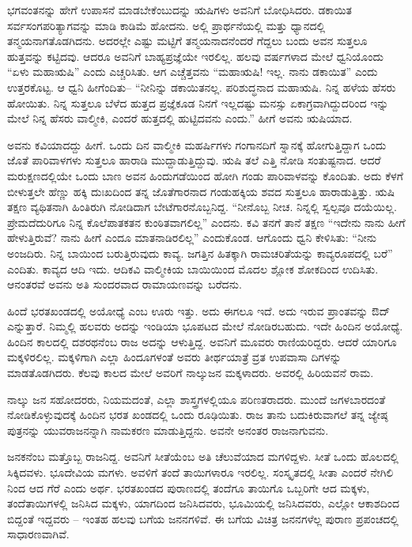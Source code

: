 ಭಗವಂತನನ್ನು ಹೇಗೆ ಉಪಾಸನೆ ಮಾಡಬೇಕೆಂಬುದನ್ನು ಋಷಿಗಳು ಅವನಿಗೆ ಬೋಧಿಸಿದರು. ಡಕಾಯಿತ ಸರ್ವಸಂಗಪರಿತ್ಯಾಗವನ್ನು ಮಾಡಿ ಕಾಡಿಮೆ ಹೋದನು. ಅಲ್ಲಿ ಪ್ರಾರ್ಥನೆಯಲ್ಲಿ ಮತ್ತು ಧ್ಯಾನದಲ್ಲಿ ತನ್ಮಯನಾಗತೊಡಗಿದನು. ಅದರಲ್ಲೇ ಎಷ್ಟು ಮಟ್ಟಿಗೆ ತನ್ಮಯನಾದನೆಂದರೆ ಗೆದ್ದಲು ಬಂದು ಅವನ ಸುತ್ತಲೂ ಹುತ್ತವನ್ನು ಕಟ್ಟಿದವು. ಆದರೂ ಅವನಿಗೆ ಬಾಹ್ಯಪ್ರಜ್ಞೆಯೇ ಇರಲಿಲ್ಲ. ಹಲವು ವರ್ಷಗಳಾದ ಮೇಲೆ ಧ್ವನಿಯೊಂದು “ಏಳು ಮಹಾಋಷಿ” ಎಂದು ಎಚ್ಚರಿಸಿತು. ಆಗ ಎಚ್ಚೆತ್ತವನು “ಮಹಾಋಷಿ! ಇಲ್ಲ. ನಾನು ಡಕಾಯಿತ” ಎಂದು ಉತ್ತರಕೊಟ್ಟ. ಆ ಧ್ವನಿ ಹೀಗೆಂದಿತು– “ನೀನಿನ್ನು ಡಕಾಯಿತನಲ್ಲ. ಪರಿಶುದ್ಧನಾದ ಮಹಾಋಷಿ. ನಿನ್ನ ಹಳೆಯ ಹೆಸರು ಹೋಯಿತು. ನಿನ್ನ ಸುತ್ತಲೂ ಬೆಳೆದ ಹುತ್ತದ ಪ್ರಜ್ಞೆಕೂಡ ನಿನಗೆ ಇಲ್ಲದಷ್ಟು ಮನಸ್ಸು ಏಕಾಗ್ರವಾಗಿದ್ದುದರಿಂದ ಇನ್ನು ಮೇಲೆ ನಿನ್ನ ಹೆಸರು ವಾಲ್ಮೀಕಿ, ಎಂದರೆ ಹುತ್ತದಲ್ಲಿ ಹುಟ್ಟಿದವನು ಎಂದು.” ಹೀಗೆ ಅವನು ಋಷಿಯಾದ.

ಅವನು ಕವಿಯಾದದ್ದು ಹೀಗೆ. ಒಂದು ದಿನ ವಾಲ್ಮೀಕಿ ಮಹರ್ಷಿಗಳು ಗಂಗಾನದಿಗೆ ಸ್ನಾನಕ್ಕೆ ಹೋಗುತ್ತಿದ್ದಾಗ ಒಂದು ಜೊತೆ ಪಾರಿವಾಳಗಳು ಸುತ್ತಲೂ ಹಾರಾಡಿ ಮುದ್ದಾಡುತ್ತಿದ್ದುವು. ಋಷಿ ತಲೆ ಎತ್ತಿ ನೋಡಿ ಸಂತುಷ್ಟನಾದ. ಆದರೆ ಮರುಕ್ಷಣದಲ್ಲಿಯೇ ಒಂದು ಬಾಣ ಅವನ ಹಿಂದುಗಡೆಯಿಂದ ಹೋಗಿ ಗಂಡು ಪಾರಿವಾಳವನ್ನು ಕೊಂದಿತು. ಅದು ಕೆಳಗೆ ಬೀಳುತ್ತಲೇ ಹೆಣ್ಣು ಹಕ್ಕಿ ದುಃಖದಿಂದ ತನ್ನ ಜೊತೆಗಾರನಾದ ಗಂಡುಹಕ್ಕಿಯ ಶವದ ಸುತ್ತಲೂ ಹಾರಾಡುತ್ತಿತ್ತು. ಋಷಿ ತಕ್ಷಣ ವ್ಯಥಿತನಾಗಿ ಹಿಂತಿರುಗಿ ನೋಡಿದಾಗ ಬೇಟೆಗಾರನೊಬ್ಬನಿದ್ದ. “ನೀನೊಬ್ಬ ನೀಚ. ನಿನ್ನಲ್ಲಿ ಸ್ವಲ್ಪವೂ ದಯೆಯಿಲ್ಲ. ಪ್ರೇಮದೆದುರಿಗೂ ನಿನ್ನ ಕೊಲೆಪಾತಕತನ ಕುಂಠಿತವಾಗಲಿಲ್ಲ” ಎಂದನು. ಕವಿ ತನಗೆ ತಾನೆ ತಕ್ಷಣ “ಇದೇನು ನಾನು ಹೀಗೆ ಹೇಳುತ್ತಿರುವೆ? ನಾನು ಹೀಗೆ ಎಂದೂ ಮಾತನಾಡಿರಲಿಲ್ಲ” ಎಂದುಕೊಂಡ. ಆಗೊಂದು ಧ್ವನಿ ಕೇಳಿಸಿತು: “ನೀನು ಅಂಜದಿರು. ನಿನ್ನ ಬಾಯಿಂದ ಬರುತ್ತಿರುವುದು ಕಾವ್ಯ. ಜಗತ್ತಿನ ಹಿತಕ್ಕಾಗಿ ರಾಮಚರಿತೆಯನ್ನು ಕಾವ್ಯರೂಪದಲ್ಲಿ ಬರೆ” ಎಂದಿತು. ಕಾವ್ಯದ ಆದಿ ಇದು. ಆದಿಕವಿ ವಾಲ್ಮೀಕಿಯ ಬಾಯಿಯಿಂದ ಮೊದಲ ಶ್ಲೋಕ ಶೋಕದಿಂದ ಉದಿಸಿತು. ಆನಂತರವೆ ಅವನು ಅತಿ ಸುಂದರವಾದ ರಾಮಾಯಣವನ್ನು ಬರೆದನು.

ಹಿಂದೆ ಭರತಖಂಡದಲ್ಲಿ ಅಯೋಧ್ಯೆ ಎಂಬ ಊರು ಇತ್ತು. ಅದು ಈಗಲೂ ಇದೆ. ಅದು ಇರುವ ಪ್ರಾಂತವನ್ನು ಔದ್​ ಎನ್ನುತ್ತಾರೆ. ನಿಮ್ಮಲ್ಲಿ ಹಲವರು ಅದನ್ನು ಇಂಡಿಯಾ ಭೂಪಟದ ಮೇಲೆ ನೋಡಿರಬಹುದು. ಇದೇ ಹಿಂದಿನ ಅಯೋಧ್ಯೆ. ಹಿಂದಿನ ಕಾಲದಲ್ಲಿ ದಶರಥನೆಂಬ ರಾಜ ಅದನ್ನು ಆಳುತ್ತಿದ್ದ. ಅವನಿಗೆ ಮೂವರು ರಾಣಿಯರಿದ್ದರು. ಆದರೆ ಯಾರಿಗೂ ಮಕ್ಕಳಿರಲಿಲ್ಲ. ಮಕ್ಕಳಿಗಾಗಿ ಎಲ್ಲಾ ಹಿಂದೂಗಳಂತೆ ಅವರು ತೀರ್ಥಯಾತ್ರೆ ವ್ರತ ಉಪವಾಸಾ ದಿಗಳನ್ನು ಮಾಡತೊಡಗಿದರು. ಕೆಲವು ಕಾಲದ ಮೇಲೆ ಅವರಿಗೆ ನಾಲ್ಕುಜನ ಮಕ್ಕಳಾದರು. ಅವರಲ್ಲಿ ಹಿರಿಯವನೆ ರಾಮ.

ನಾಲ್ಕು ಜನ ಸಹೋದರರು, ನಿಯಮದಂತೆ, ಎಲ್ಲಾ ಶಾಸ್ತ್ರಗಳಲ್ಲಿಯೂ ಪರಿಣತರಾದರು. ಮುಂದೆ ಜಗಳಬಾರದಂತೆ ನೋಡಿಕೊಳ್ಳುವುದಕ್ಕೆ ಹಿಂದಿನ ಭರತ ಖಂಡದಲ್ಲಿ ಒಂದು ರೂಢಿಯಿತು. ರಾಜ ತಾನು ಬದುಕಿರುವಾಗಲೆ ತನ್ನ ಜ್ಯೇಷ್ಠ ಪುತ್ರನನ್ನು ಯುವರಾಜನನ್ನಾಗಿ ನಾಮಕರಣ ಮಾಡುತ್ತಿದ್ದನು. ಅವನೇ ಅನಂತರ ರಾಜನಾಗುವನು.

ಜನಕನೆಂಬ ಮತ್ತೊಬ್ಬ ರಾಜನಿದ್ದ. ಅವನಿಗೆ ಸೀತೆಯೆಂಬ ಅತಿ ಚೆಲುವೆಯಾದ ಮಗಳಿದ್ದಳು. ಸೀತೆ ಒಂದು ಹೊಲದಲ್ಲಿ ಸಿಕ್ಕಿದವಳು. ಭೂದೇವಿಯ ಮಗಳು. ಅವಳಿಗೆ ತಂದೆ ತಾಯಿಗಳಾರೂ ಇರಲಿಲ್ಲ. ಸಂಸ್ಕೃತದಲ್ಲಿ ಸೀತಾ ಎಂದರೆ ನೇಗಿಲಿ ನಿಂದ ಆದ ಗೆರೆ ಎಂದು ಅರ್ಥ. ಭರತಖಂಡದ ಪುರಾಣದಲ್ಲಿ ತಂದೆಗೂ ತಾಯಿಗೊ ಒಬ್ಬರಿಗೇ ಆದ ಮಕ್ಕಳು, ತಂದೆತಾಯಿಗಳಲ್ಲಿ ಜನಿಸಿದ ಮಕ್ಕಳು, ಯಾಗದಿಂದ ಜನಿಸಿದವರು, ಭೂಮಿಯಲ್ಲಿ ಜನಿಸಿದವರು, ಎಲ್ಲೋ ಆಕಾಶದಿಂದ ಬಿದ್ದಂತೆ ಇದ್ದವರು – ಇಂತಹ ಹಲವು ಬಗೆಯ ಜನನಗಳಿವೆ. ಈ ಬಗೆಯ ವಿಚಿತ್ರ ಜನನಗಳೆಲ್ಲ ಪುರಾಣ ಪ್ರಪಂಚದಲ್ಲಿ ಸಾಧಾರಣವಾಗಿವೆ.

